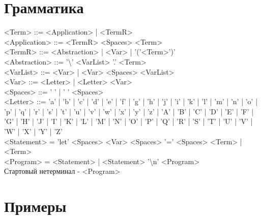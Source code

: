 \documentclass{article}
\begin{document}
\section{Грамматика}
<Term> ::= <Application> | <TermR> \\
<Application> ::= <TermR> <Spaces> <Term> \\
<TermR> ::= <Abstraction> | <Var> | '('<Term>')' \\
<Abstraction> ::= '\textbackslash' <VarList> '.' <Term> \\
<VarList> ::= <Var> | <Var> <Spaces> <VarList> \\
<Var> ::= <Letter> | <Letter> <Var> \\
<Spaces> ::= ' ' | ' ' <Spaces> \\
<Letter> ::= 'a' | 'b' | 'c' | 'd' | 'e' | 'f' | 'g' | 'h' | 'j' | 'i' | 'k' | 'l' | 'm' | 'n' | 'o' | 'p' | 'q' | 'r' | 's' | 't' | 'u' | 'v' | 'w' | 'x' | 'y' | 'z' | 'A' | 'B' | 'C' | 'D' | 'E' | 'F' | 'G' | 'H' | 'J' | 'I' | 'K' | 'L' | 'M' | 'N' | 'O' | 'P' | 'Q' | 'R' | 'S' | 'T' | 'U' | 'V' | 'W' | 'X' | 'Y' | 'Z'  \\
<Statement> = 'let' <Spaces> <Var> <Spaces> '=' <Spaces> <Term> | <Term> \\
<Program> = <Statement> | <Statement> '\textbackslash n' <Program> \\
Стартовый нетерминал - <Program>

\section{Примеры}
\end{document}
